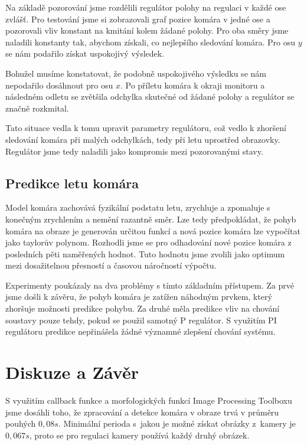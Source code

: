 \documentclass[a4paper,10pt]{article}
\begin{document}
Na základě pozorování jsme rozdělili regulátor polohy na regulaci v každé ose zvlášť.
Pro testování jsme si zobrazovali graf pozice komára v jedné ose a pozorovali vliv konstant na kmitání kolem žádané polohy. 
Pro oba směry jsme naladili konstanty tak, abychom získali, co nejlepšího sledování komára.
Pro osu $y$ se nám podařilo získat uspokojivý výsledek. 

Bohužel musíme konstatovat, že podobně uspokojivého výsledku se nám nepodařilo dosáhnout pro osu $x$. 
Po příletu komára k okraji monitoru a následném odletu se zvětšila odchylka skutečné od žádané polohy 
a regulátor se značně rozkmital. 

Tato situace vedla k tomu upravit parametry regulátoru, což vedlo k zhoršení sledování komára při malých odchylkách, 
tedy při letu uprostřed obrazovky. Regulátor jsme tedy naladili jako kompromis mezi pozorovanými stavy. 

\subsection{Predikce letu komára}

Model komára zachovává fyzikální podstatu letu, zrychluje a zpomaluje s koneč\-ným zrychlením a nemění razantně směr.
Lze tedy předpokládat, že pohyb komára na obraze je generován určitou funkcí a 
nová pozice komára lze vypočítat jako taylorův polynom. 
Rozhodli jsme se pro odhadování nové pozice komára z posledních pěti naměřených hodnot.
Tuto hodnotu jsme zvolili jako optimum mezi dosažitelnou přesností a časovou náročností výpočtu.

Experimenty poukázaly na dva problémy s tímto základním přístupem. 
Za prvé jsme došli k závěru, že pohyb komára je zatížen náhodným prvkem, který zhoršuje možnosti predikce pohybu.
Za druhé měla predikce vliv na chování soustavy pouze tehdy, pokud se použil samotný P regulátor. 
S využitím PI regulátoru predikce nepřinášela žádné významné zlepšení chování systému.


\section{Diskuze a Závěr}

S využitím callback funkce a 
morfologických funkcí Image Processing Toolboxu jsme dosáhli toho, že zpracování a 
detekce komára v obraze trvá v průměru pouhých $0,08 s$. 
Minimální perioda s~jakou je možné získat obrázky z~kamery je $0,067 s$,
proto se pro regulaci kamery používá každý druhý obrázek.
\end{document}
